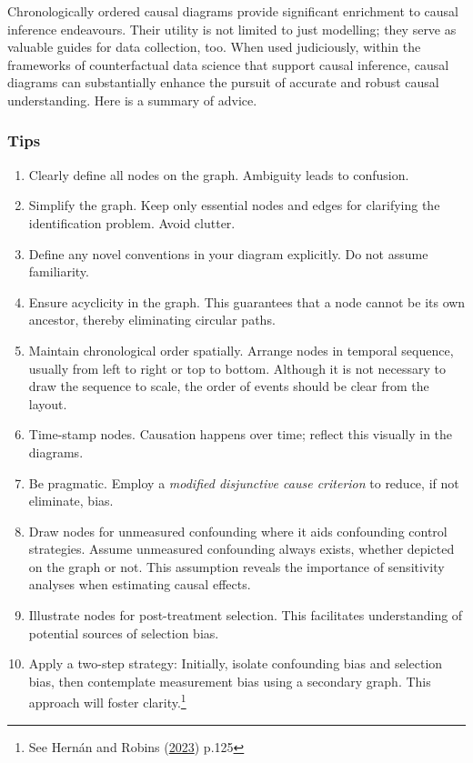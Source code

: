 \documentclass[
  singlecolumn]{article}
\begin{document}
Chronologically ordered causal diagrams provide significant enrichment
to causal inference endeavours. Their utility is not limited to just
modelling; they serve as valuable guides for data collection, too. When
used judiciously, within the frameworks of counterfactual data science
that support causal inference, causal diagrams can substantially enhance
the pursuit of accurate and robust causal understanding. Here is a
summary of advice.

\hypertarget{tips}{%
\subsubsection{Tips}\label{tips}}

\begin{enumerate}
\def\labelenumi{\arabic{enumi}.}
\item
  Clearly define all nodes on the graph. Ambiguity leads to confusion.
\item
  Simplify the graph. Keep only essential nodes and edges for clarifying
  the identification problem. Avoid clutter.
\item
  Define any novel conventions in your diagram explicitly. Do not assume
  familiarity.
\item
  Ensure acyclicity in the graph. This guarantees that a node cannot be
  its own ancestor, thereby eliminating circular paths.
\item
  Maintain chronological order spatially. Arrange nodes in temporal
  sequence, usually from left to right or top to bottom. Although it is
  not necessary to draw the sequence to scale, the order of events
  should be clear from the layout.
\item
  Time-stamp nodes. Causation happens over time; reflect this visually
  in the diagrams.
\item
  Be pragmatic. Employ a \emph{modified disjunctive cause criterion} to
  reduce, if not eliminate, bias.
\item
  Draw nodes for unmeasured confounding where it aids confounding
  control strategies. Assume unmeasured confounding always exists,
  whether depicted on the graph or not. This assumption reveals the
  importance of sensitivity analyses when estimating causal effects.
\item
  Illustrate nodes for post-treatment selection. This facilitates
  understanding of potential sources of selection bias.
\item
  Apply a two-step strategy: Initially, isolate confounding bias and
  selection bias, then contemplate measurement bias using a secondary
  graph. This approach will foster clarity.\footnote{See Hernán and
    Robins (\protect\hyperlink{ref-hernuxe1n2023}{2023}) p.125}
\end{enumerate}
\end{document}
